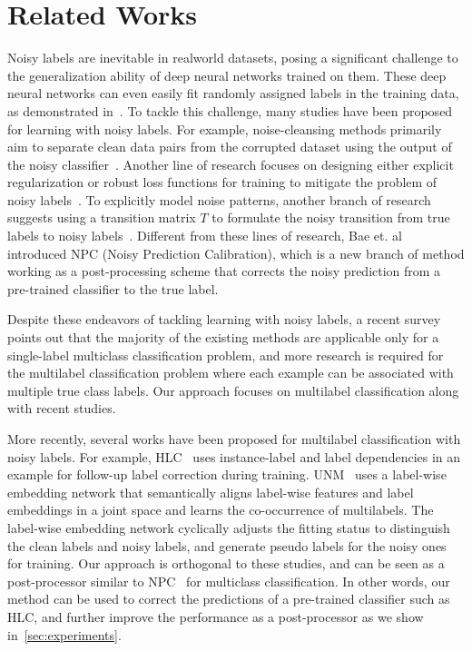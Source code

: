 \section{Related Works}
\label{sec:related}
Noisy labels are inevitable in realworld datasets, posing a significant challenge to the generalization ability of deep neural networks trained on them. These deep neural networks can even easily fit randomly assigned labels in the training data, as demonstrated in~\cite{zhang2021understanding}. To tackle this challenge, many studies have been proposed for learning with noisy labels. For example, noise-cleansing methods primarily aim to separate clean data pairs from the corrupted dataset using the output of the noisy classifier~\cite{malach2017decoupling,wang2021proselflc,kim2021fine,han2018masking,tanaka2018joint,han2018co,yu2019does,wei2020combating,zheng2021meta,zheng2020error}. 
Another line of research focuses on designing either explicit regularization or robust loss functions for training to mitigate the problem of noisy labels~\cite{liu2020early,xia2020robust,zhang2018generalized,wang2019symmetric,ma2020normalized}. 
To explicitly model  noise patterns, another branch of research suggests using a transition matrix $T$ to formulate the noisy transition from true labels to noisy labels~\cite{patrini2017making,yao2020dual,zhang2021learning,xia2020part,berthon2021confidence}. 
Different from these lines of research, Bae et. al~\cite{Bae2022from} introduced NPC (Noisy Prediction Calibration), which is a new branch of method working as a post-processing scheme that corrects the noisy prediction from a pre-trained classifier to the true label.

Despite these endeavors of tackling learning with noisy labels, a recent survey~\cite{song2022learning} points out that the majority of the existing methods are applicable only for a
single-label multiclass classification problem, and more research is required for the multilabel classification problem where each example can be associated with multiple true class labels. 
Our approach focuses on multilabel classification along with recent studies.

More recently, several works have been proposed for multilabel classification with noisy labels.
For example, HLC~\cite{xia2023holistic} uses instance-label and label dependencies in an example for follow-up label correction during training. 
UNM~\cite{chen2024unm} uses a label-wise embedding network that semantically aligns label-wise features and label embeddings in a joint space and learns the co-occurrence of multilabels. The label-wise embedding network cyclically adjusts the fitting status to distinguish the clean labels and noisy labels, and generate pseudo labels for the noisy ones for training. 
Our approach is orthogonal to these studies, and can be seen as a post-processor similar to NPC~\cite{Bae2022from} for multiclass classification. 
In other words, our method can be used to correct the predictions of a pre-trained classifier such as HLC, and further improve the performance as a post-processor as we show in~\cref{sec:experiments}.